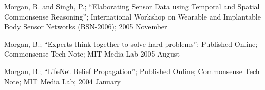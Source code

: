 \noindent Morgan, B. and Singh, P.; ``Elaborating Sensor Data using
 Temporal and Spatial Commonsense Reasoning''; International Workshop
 on Wearable and Implantable Body Sensor Networks (BSN-2006); 2005
 November

\vspace{5mm}

\noindent Morgan, B.; ``Experts think together to solve hard problems'';
 Published Online; Commonsense Tech Note; MIT Media Lab 2005 August

\vspace{5mm}

\noindent Morgan, B.; ``LifeNet Belief Propagation''; Published Online;
 Commonsense Tech Note; MIT Media Lab; 2004 January

\pagebreak
